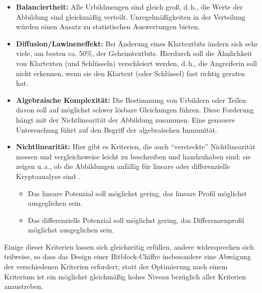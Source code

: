 \begin{refsegment}
\begin{itemize}
\item \textbf{Balanciertheit:} Alle Urbildmengen
    sind gleich groß, d.\,h., die Werte
    der Abbildung sind gleichmäßig verteilt. Unregelmäßigkeiten in der Verteilung
    würden einen Ansatz zu statistischen Auswertungen bieten.
\item \textbf{Diffusion/Lawineneffekt:}
    Bei Änderung eines Klartextbits ändern sich sehr viele, am besten
    ca. 50\%, der Geheimtextbits. Hierdurch soll die Ähnlichkeit von Klartexten
    (und Schlüsseln) verschleiert werden, d.\,h., die Angreiferin soll nicht
    erkennen, wenn sie den Klartext (oder Schlüssel) fast richtig geraten hat.
\item \textbf{Algebraische Komplexität:} Die Bestimmung von Urbildern oder Teilen
    davon soll auf möglichst schwer lösbare Gleichungen führen. Diese Forderung
    hängt mit der Nichtlinearität der Abbildung zusammen.
    Eine genauere Untersuchung führt auf den Begriff der algebraischen
    Immunität.
\item \textbf{Nichtlinearität:} Hier gibt es Kriterien, die auch "`versteckte"'
    Nichtlinearität messen und vergleichsweise leicht
    zu beschreiben und handzuhaben
    sind; sie zeigen u.\,a., ob die Abbildungen anfällig für
    lineare
    oder differenzielle
    Kryptoanalyse sind \cite{Pomm2008}.
    \begin{itemize}
    \item Das lineare Potenzial
        soll möglichst gering, das
        lineare Profil möglichst
        ausgeglichen sein.
    \item Das differenzielle
        Potenzial
        soll möglichst gering, das
        Differenzenprofil möglichst ausgeglichen sein.
    \end{itemize}
\end{itemize}
Einige dieser Kriterien lassen sich gleichzeitig erfüllen, andere
widersprechen sich teilweise, so dass das Design einer
Bitblock-Chiffre
insbesondere eine Abwägung der verschiedenen Kriterien erfordert;
statt der Optimierung nach einem Kriterium ist ein möglichst
gleichmäßig hohes Niveau bezüglich aller Kriterien anzustreben.


\end{refsegment}
